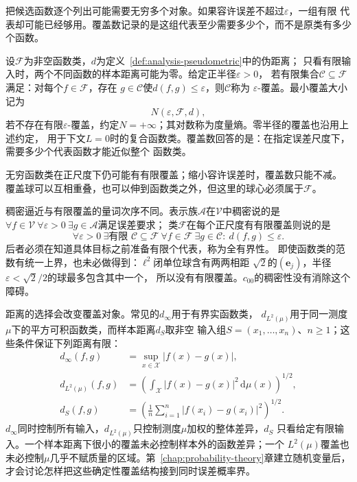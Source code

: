 把候选函数逐个列出可能需要无穷多个对象。如果容许误差不超过$\varepsilon$，一组有限
代表却可能已经够用。覆盖数记录的是这组代表至少需要多少个，而不是原类有多少个函数。
\begin{definition}[函数类的覆盖数与度量熵]
\label{def:functional-covering-number}
设$\mathcal F$为非空函数类，$d$为定义~\ref{def:analysis-pseudometric}中的伪距离；
只看有限输入时，两个不同函数的样本距离可能为零。给定正半径$\varepsilon>0$，
若有限集合$\mathcal{C}\subseteq\mathcal{F}$满足：对每个$f\in\mathcal{F}$，存在
$g\in\mathcal{C}$使$d(f,g)\leq\varepsilon$，则$\mathcal{C}$称为
$\varepsilon$-覆盖。最小覆盖大小记为
\[
  N(\varepsilon,\mathcal{F},d),
\]
若不存在有限$\varepsilon$-覆盖，约定$N=+\infty$；其对数称为度量熵。零半径的覆盖也沿用上述约定，
用于下文$L=0$时的复合函数类。覆盖数回答的是：在指定误差尺度下，需要多少个代表函数才能近似整个
函数类。
\end{definition}
无穷函数类在正尺度下仍可能有有限覆盖；缩小容许误差时，覆盖数只能不减。
覆盖球可以互相重叠，也可以伸到函数类之外，但这里的球心必须属于$\mathcal F$。

稠密逼近与有限覆盖的量词次序不同。表示族$\mathcal A$在$\mathcal V$中稠密说的是
$\forall f\in\mathcal V\ \forall\varepsilon>0\ \exists g\in\mathcal A$满足误差要求；
类$\mathcal F$在每个正尺度有有限覆盖则说的是
\[
 \forall\varepsilon>0\ \exists\text{有限 }\mathcal C\subseteq\mathcal F\
 \forall f\in\mathcal F\ \exists g\in\mathcal C:\ d(f,g)\leq\varepsilon.
\]
后者必须在知道具体目标之前准备有限个代表，称为全有界性。
即使函数类的范数有统一上界，也未必做得到：$\ell^2$闭单位球含有两两相距
$\sqrt2$的$(\bm e_j)$，半径$\varepsilon<\sqrt2/2$的球最多包含其中一个，
所以没有有限覆盖。$c_{00}$的稠密性没有消除这个障碍。

距离的选择会改变覆盖对象。常见的$d_\infty$用于有界实函数类，
$d_{L^2(\mu)}$用于同一测度$\mu$下的平方可积函数类，而样本距离$d_S$取非空
输入组$S=(x_1,\ldots,x_n)$、$n\geq1$；这些条件保证下列距离有限：
\begin{align*}
  d_{\infty}(f,g)
  &=
  \sup_{x\in\mathcal{X}}|f(x)-g(x)|,\\
  d_{L^2(\mu)}(f,g)
  &=
  \left(
    \int_{\mathcal{X}}|f(x)-g(x)|^2\,\mathrm{d}\mu(x)
  \right)^{1/2},\\
  d_S(f,g)
  &=
  \left(
    \frac1n\sum_{i=1}^{n}|f(x_i)-g(x_i)|^2
  \right)^{1/2}.
\end{align*}
$d_\infty$同时控制所有输入，$d_{L^2(\mu)}$只控制测度$\mu$加权的整体差异，$d_S$
只看给定有限输入。一个样本距离下很小的覆盖未必控制样本外的函数差异；一个
$L^2(\mu)$覆盖也未必控制$\mu$几乎不赋质量的区域。第~\ref{chap:probability-theory}章建立随机变量后，
才会讨论怎样把这些确定性覆盖结构接到同时误差概率界。

